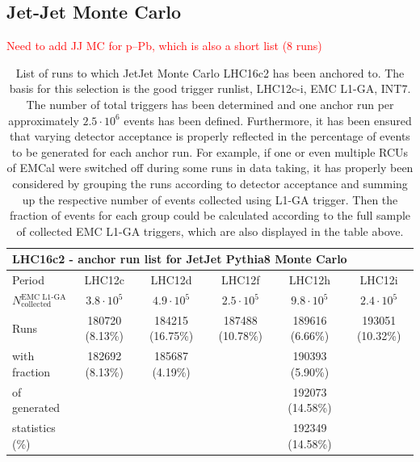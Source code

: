 \documentclass[ALICE]{ALICE_analysis_notes}
\newcommand{\pPb}{{\mbox{p--Pb}}\xspace}
\begin{document}
\begin{appendix}
\newpage

\subsection{Jet-Jet Monte Carlo}	
\label{subsec:runsJJMC}
\textcolor{red}{Need to add JJ MC for \pPb, which is also a short list (8 runs)}
	
\begin{table}[h!]
	\hspace*{-0.2cm}
	\small
	\centering
	\begin{tabular}{lccccc}  
	    \toprule
		\multicolumn{6}{l}{\textbf{LHC16c2 - anchor run list for JetJet Pythia8 Monte Carlo}} \\ \midrule
		Period & LHC12c & LHC12d & LHC12f & LHC12h & LHC12i\\
		$N^{\text{EMC L1-GA}}_{\text{collected}}$ & $3.8 \cdot 10^{5}$ & $4.9 \cdot 10^{5}$ & $2.5 \cdot 10^{5}$ & $9.8 \cdot 10^{5}$ & $2.4 \cdot 10^{5}$\\ \midrule
		Runs 			 & 180720 (8.13\%) & 184215 (16.75\%) & 187488 (10.78\%) & 189616 (6.66\%) & 193051 (10.32\%) \\
		with fraction	 & 182692 (8.13\%) & 185687 (4.19\%) &  & 190393 (5.90\%) &  \\
		of generated	 &  &  &  & 192073 (14.58\%) &  \\
		statistics (\%)	 &  &  &  & 192349 (14.58\%) &  \\
		\bottomrule
	\end{tabular}
	\caption{List of runs to which JetJet Monte Carlo LHC16c2 has been anchored to. The basis for this selection is the good trigger runlist, LHC12c-i, EMC L1-GA, INT7. The number of total triggers has been determined and one anchor run per approximately $ 2.5 \cdot 10^{6}$ events has been defined. Furthermore, it has been ensured that varying detector acceptance is properly reflected in the percentage of events to be generated for each anchor run. For example, if one or even multiple RCUs of EMCal were switched off during some runs in data taking, it has properly been considered by grouping the runs according to detector acceptance and summing up the respective number of events collected using L1-GA trigger. Then the fraction of events for each group could be calculated according to the full sample of collected EMC L1-GA triggers, which are also displayed in the table above.}
	\label{tab:runsJetJet}
\end{table}

\newpage
	

\end{appendix}
\end{document}
